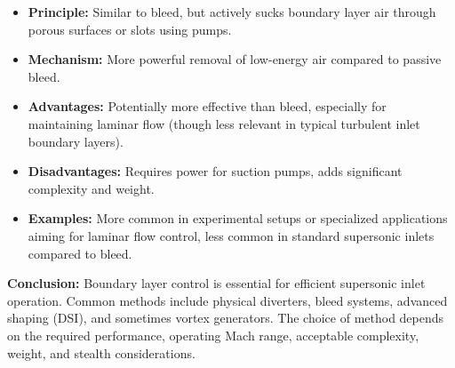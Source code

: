 \begin{enumerate}
  \begin{itemize}
  \tightlist
  \item
    \textbf{Principle:} Similar to bleed, but actively sucks boundary
    layer air through porous surfaces or slots using pumps.
  \item
    \textbf{Mechanism:} More powerful removal of low-energy air compared
    to passive bleed.
  \item
    \textbf{Advantages:} Potentially more effective than bleed,
    especially for maintaining laminar flow (though less relevant in
    typical turbulent inlet boundary layers).
  \item
    \textbf{Disadvantages:} Requires power for suction pumps, adds
    significant complexity and weight.
  \item
    \textbf{Examples:} More common in experimental setups or specialized
    applications aiming for laminar flow control, less common in
    standard supersonic inlets compared to bleed.
  \end{itemize}
\end{enumerate}

\textbf{Conclusion:} Boundary layer control is essential for efficient
supersonic inlet operation. Common methods include physical diverters,
bleed systems, advanced shaping (DSI), and sometimes vortex generators.
The choice of method depends on the required performance, operating Mach
range, acceptable complexity, weight, and stealth considerations.
